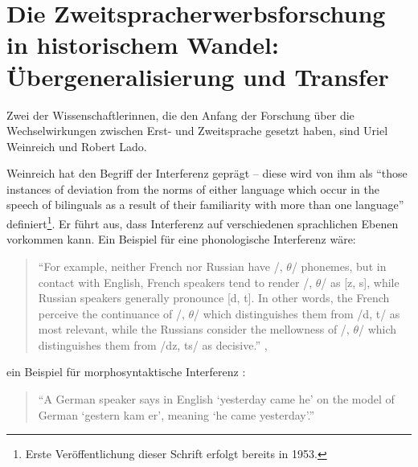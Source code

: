 \section{Die Zweitspracherwerbsforschung in historischem Wandel: Übergeneralisierung und Transfer}

Zwei der Wissenschaftlerinnen, die den Anfang der Forschung über die Wechselwirkungen zwischen Erst- und Zweitsprache gesetzt haben, sind Uriel Weinreich und Robert Lado.

Weinreich hat den Begriff der Interferenz geprägt --
diese wird von ihm als ``those instances of deviation from the norms of either language which occur in the speech of bilinguals as a result of their familiarity with more than one language'' \cite{Weinreich79}
definiert\footnote{Erste Veröffentlichung dieser Schrift erfolgt bereits in 1953.}.
Er führt aus, dass Interferenz auf verschiedenen sprachlichen Ebenen vorkommen kann.
Ein Beispiel für eine phonologische Interferenz wäre:
\begin{quote}
``For example, neither French nor Russian have /, $\theta$/ phonemes, but in contact
    with English, French speakers tend to render /, $\theta$/ as [z, s], while Russian
    speakers generally pronounce [d, t].
    In other words, the French perceive the continuance of /, $\theta$/ which distinguishes them from /d, t/ as most relevant, while
    the Russians consider the mellowness of /, $\theta$/ which distinguishes them from /dz, ts/ as decisive.''
\cite{Weinreich79},
\end{quote}
ein Beispiel für morphosyntaktische Interferenz :
\begin{quote}
``A German speaker says in English `yesterday came he' on the model of German
`gestern kam er', meaning `he came yesterday'.''
\cite{Weinreich79}
\end{quote}






